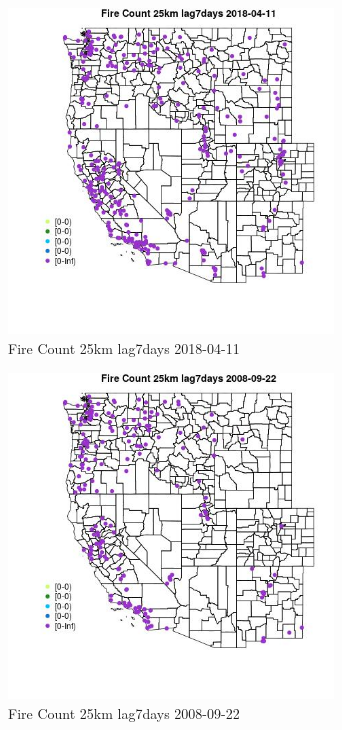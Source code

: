 \begin{figure} 
\centering  
\includegraphics[width=0.77\textwidth]{Code_Outputs/Report_ML_input_PM25_Step4_part_e_de_duplicated_aves_compiled_2019-05-18wNAs_MapObsFire_Count_25km_lag7days2018-04-11.jpg} 
\caption{\label{fig:Report_ML_input_PM25_Step4_part_e_de_duplicated_aves_compiled_2019-05-18wNAsMapObsFire_Count_25km_lag7days2018-04-11}Fire Count 25km lag7days 2018-04-11} 
\end{figure} 
 

\clearpage 

\begin{figure} 
\centering  
\includegraphics[width=0.77\textwidth]{Code_Outputs/Report_ML_input_PM25_Step4_part_e_de_duplicated_aves_compiled_2019-05-18wNAs_MapObsFire_Count_25km_lag7days2008-09-22.jpg} 
\caption{\label{fig:Report_ML_input_PM25_Step4_part_e_de_duplicated_aves_compiled_2019-05-18wNAsMapObsFire_Count_25km_lag7days2008-09-22}Fire Count 25km lag7days 2008-09-22} 
\end{figure} 
 

